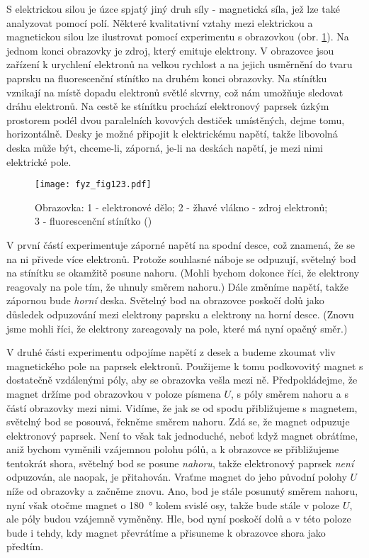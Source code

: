 {    S elektrickou silou je úzce spjatý jiný druh síly - magnetická síla, jež lze také analyzovat 
    pomocí polí. Některé kvalitativní vztahy mezi elektrickou a magnetickou silou lze ilustrovat 
    pomocí experimentu s obrazovkou (obr. \ref{fyz:fig123}). Na jednom konci obrazovky je zdroj, 
    který emituje elektrony. V obrazovce jsou zařízení k urychlení elektronů na velkou rychlost a 
    na jejich usměrnění do tvaru paprsku na fluorescenční stínítko na druhém konci obrazovky. Na 
    stínítku vznikají na místě dopadu elektronů světlé skvrny, což nám umožňuje sledovat dráhu 
    elektronů. Na cestě ke stínítku prochází elektronový paprsek úzkým prostorem podél dvou 
    paralelních kovových destiček umístěných, dejme tomu, horizontálně. Desky je možné připojit k 
    elektrickému napětí, takže libovolná deska může být, chceme-li, záporná, je-li na deskách 
    napětí, je mezi nimi elektrické pole.
    
    \begin{figure}[ht!]  %
      \centering
      \texttt{[image: fyz\_fig123.pdf]}
      \caption{Obrazovka: 1 - elektronové dělo; 2 - žhavé vlákno - zdroj elektronů; 3 - 
               fluorescenční stínítko 
              (\cite[s.~179]{Feynman01})}
      \label{fyz:fig123}
    \end{figure}
    
    V první částí experimentuje záporné napětí na spodní desce, což znamená, že se na ni přivede 
    více elektronů. Protože souhlasné náboje se odpuzují, světelný bod na stínítku se okamžitě 
    posune nahoru. (Mohli bychom dokonce říci, že elektrony reagovaly na pole tím, že uhnuly směrem 
    nahoru.) Dále změníme napětí, takže zápornou bude \emph{horní} deska. Světelný bod na obrazovce 
    poskočí dolů jako důsledek odpuzování mezi elektrony paprsku a elektrony na horní desce. (Znovu 
    jsme mohli říci, že elektrony zareagovaly na pole, které má nyní opačný směr.)
    
    
    V	druhé části experimentu odpojíme napětí z desek a budeme zkoumat vliv magnetického pole na 
    paprsek elektronů. Použijeme k tomu podkovovitý magnet s dostatečně vzdálenými póly, aby se 
    obrazovka vešla mezi ně. Předpokládejme, že magnet držíme pod obrazovkou v poloze písmena 
    \(U\), s póly směrem nahoru a s částí obrazovky mezi nimi. Vidíme, že jak se od spodu 
    přibližujeme s magnetem, světelný bod se posouvá, řekněme směrem nahoru. Zdá se, že magnet 
    odpuzuje elektronový paprsek. Není to však tak jednoduché, neboť když magnet obrátíme, aniž 
    bychom vyměnili vzájemnou polohu pólů, a k obrazovce se přibližujeme tentokrát shora, světelný 
    bod se posune \emph{nahoru}, takže elektronový paprsek \emph{není} odpuzován, ale naopak, je 
    přitahován. Vraťme magnet do jeho původní polohy \(U\) níže od obrazovky a začněme znovu. Ano, 
    bod je stále posunutý směrem nahoru, nyní však otočme magnet o \SI{180}{\degree} kolem svislé 
    osy, takže bude stále v poloze \(U\), ale póly budou vzájemně vyměněny. Hle, bod nyní poskočí 
    dolů a v této poloze bude i tehdy, kdy magnet převrátíme a přisuneme k obrazovce shora jako 
    předtím.
    
}
